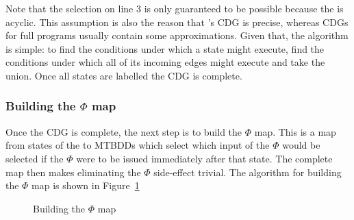 
Note that the selection on line 3 is only guaranteed to be possible
because the {\StateMachine} is acyclic.  This assumption is also the reason that
{\technique}'s CDG is precise, whereas CDGs for full programs usually
contain some approximations.  Given that, the algorithm is simple: to
find the conditions under which a state might execute, find the
conditions under which all of its incoming edges might execute and
take the union.  Once all states are labelled the CDG is complete.

\subsubsection{Building the $\Phi$ map}

Once the CDG is complete, the next step is to build the $\Phi$ map.
This is a map from states of the {\StateMachine} to MTBDDs which
select which input of the $\Phi$ would be selected if the $\Phi$ were
to be issued immediately after that state.  The complete map then
makes eliminating the $\Phi$ side-effect trivial.  The algorithm for
building the $\Phi$ map is shown in
Figure~\ref{fig:derive:phi:phi_map}

\begin{figure}
\begin{algorithmic}[1]
\EndFor
{}
\EndWhile
\end{algorithmic}
\caption{Building the $\Phi$ map}
\label{fig:derive:phi:phi_map}
\end{figure}


